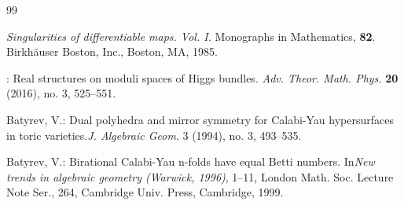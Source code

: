 \documentclass[12pt]{article}
\numberwithin{equation}{section}
\theoremstyle{remark}
\numberwithin{theorem}{section}
\numberwithin{equation}{section}
\begin{document}


\begin{thebibliography}{99}







	
	{\em	Singularities of differentiable maps. Vol. I.}
	Monographs in Mathematics, {\bf 82}. Birkh\"auser Boston, Inc., Boston, MA, 1985.
	
	:
	Real structures on moduli spaces of Higgs bundles. {\em 
		Adv. Theor. Math. Phys.} {\bf 20} (2016), no. 3, 525--551.
	
	 Batyrev, V.: Dual polyhedra and mirror symmetry for Calabi-Yau hypersurfaces in toric varieties.{\em J. Algebraic Geom}. 3 (1994), no. 3, 493–535.
	
	 Batyrev, V.: Birational Calabi-Yau n-folds have equal Betti numbers. In{\em New trends in algebraic geometry (Warwick, 1996)}, 1--11,
London Math. Soc. Lecture Note Ser., 264, Cambridge Univ. Press, Cambridge, 1999.
	

\end{thebibliography}
\end{document}

